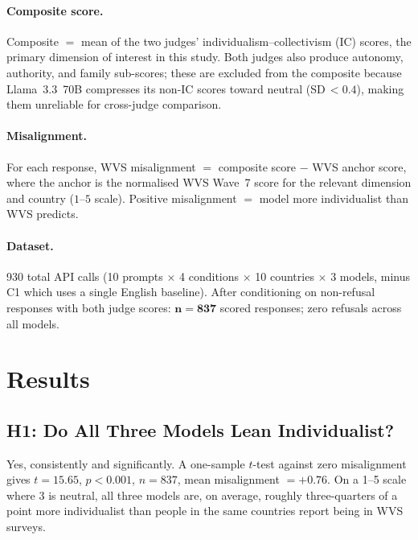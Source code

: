 \documentclass[11pt]{article}
\begin{document}
\paragraph{Composite score.}
Composite $=$ mean of the two judges' individualism--collectivism (IC) scores,
the primary dimension of interest in this study. Both judges also produce
autonomy, authority, and family sub-scores; these are excluded from the
composite because Llama~3.3~70B compresses its non-IC scores toward neutral
(SD\,$<0.4$), making them unreliable for cross-judge comparison.

\paragraph{Misalignment.}
For each response, WVS misalignment $= $ composite score $-$ WVS anchor score,
where the anchor is the normalised WVS Wave~7 score for the relevant dimension
and country ($1$--$5$ scale).
Positive misalignment $=$ model more individualist than WVS predicts.

\paragraph{Dataset.}
930 total API calls (10 prompts $\times$ 4 conditions $\times$ 10 countries
$\times$ 3 models, minus C1 which uses a single English baseline).
After conditioning on non-refusal responses with both judge scores:
$\mathbf{n = 837}$ scored responses; zero refusals across all models.

\section{Results}

\subsection{H1: Do All Three Models Lean Individualist?}

Yes, consistently and significantly. A one-sample $t$-test against zero
misalignment gives $t = 15.65$, $p < 0.001$, $n = 837$, mean misalignment
$= +0.76$. On a 1--5 scale where 3 is neutral, all three models are, on
average, roughly three-quarters of a point more individualist than people in
the same countries report being in WVS surveys.
\end{document}
